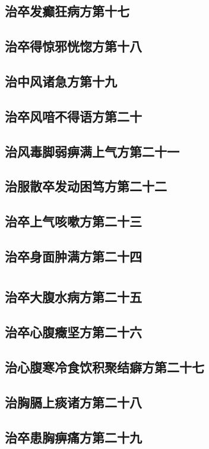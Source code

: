 \documentclass[12pt,UTF8]{ctexbook}
\begin{document}
\chapter{治卒发癫狂病方第十七}
\chapter{治卒得惊邪恍惚方第十八}
\chapter{治中风诸急方第十九}
\chapter{治卒风喑不得语方第二十}
\chapter{治风毒脚弱痹满上气方第二十一}
\chapter{治服散卒发动困笃方第二十二}
\chapter{治卒上气咳嗽方第二十三}
\chapter{治卒身面肿满方第二十四}

\part{}

\chapter{治卒大腹水病方第二十五}
\chapter{治卒心腹癥坚方第二十六}
\chapter{治心腹寒冷食饮积聚结癖方第二十七}
\chapter{治胸膈上痰诸方第二十八}
\chapter{治卒患胸痹痛方第二十九}
\end{document}
